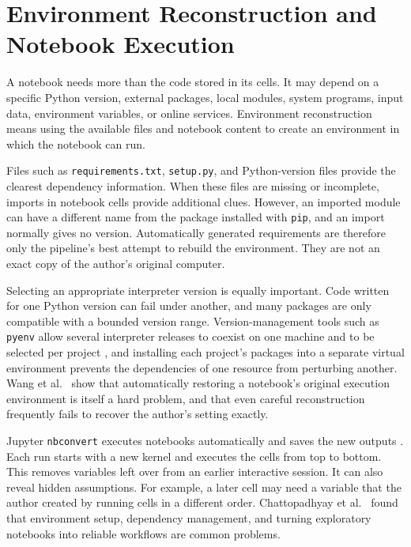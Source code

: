\clearpage
\section{Environment Reconstruction and Notebook Execution}

A notebook needs more than the code stored in its cells. It may depend on a specific Python version, external packages, local modules, system programs, input data, environment variables, or online services. Environment reconstruction means using the available files and notebook content to create an environment in which the notebook can run.

Files such as \texttt{requirements.txt}, \texttt{setup.py}, and Python-version files provide the clearest dependency information. When these files are missing or incomplete, imports in notebook cells provide additional clues. However, an imported module can have a different name from the package installed with \texttt{pip}, and an import normally gives no version. Automatically generated requirements are therefore only the pipeline's best attempt to rebuild the environment. They are not an exact copy of the author's original computer.

Selecting an appropriate interpreter version is equally important. Code written for one Python version can fail under another, and many packages are only compatible with a bounded version range. Version-management tools such as \texttt{pyenv} allow several interpreter releases to coexist on one machine and to be selected per project \cite{pyenv}, and installing each project's packages into a separate virtual environment prevents the dependencies of one resource from perturbing another. Wang et al.~\cite{wang2020restoring} show that automatically restoring a notebook's original execution environment is itself a hard problem, and that even careful reconstruction frequently fails to recover the author's setting exactly.

Jupyter \texttt{nbconvert} executes notebooks automatically and saves the new outputs \cite{nbconvert}. Each run starts with a new kernel and executes the cells from top to bottom. This removes variables left over from an earlier interactive session. It can also reveal hidden assumptions. For example, a later cell may need a variable that the author created by running cells in a different order. Chattopadhyay et al.~\cite{chattopadhyay2020} found that environment setup, dependency management, and turning exploratory notebooks into reliable workflows are common problems.

